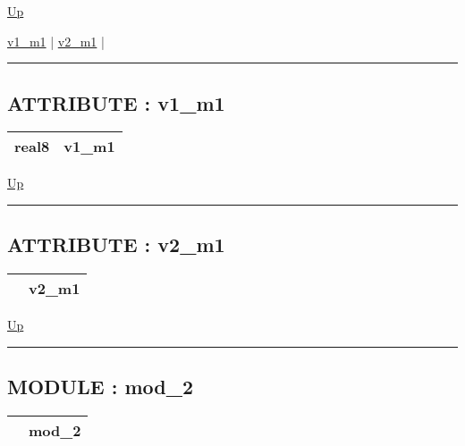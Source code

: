 \hyperlink{ecldoc:intest.in1intest.example_2}{Up}

\par


\hyperlink{ecldoc:intest.in1intest.example_2.mod_1.v1_m1}{v1\_m1}  |
\hyperlink{ecldoc:intest.in1intest.example_2.mod_1.v2_m1}{v2\_m1}  |

\rule{\textwidth}{0.4pt}

\subsection*{ATTRIBUTE : v1\_m1}
\hypertarget{ecldoc:intest.in1intest.example_2.mod_1.v1_m1}{}

{\renewcommand{\arraystretch}{1.5}
\begin{tabularx}{\textwidth}{|>{\raggedright\arraybackslash}l|X|}
\hline
\hspace{0pt}real8 & v1\_m1 \\
\hline
\end{tabularx}
}

\hyperlink{ecldoc:intest.in1intest.example_2.mod_1}{Up}

\par


\rule{\textwidth}{0.4pt}
\subsection*{ATTRIBUTE : v2\_m1}
\hypertarget{ecldoc:intest.in1intest.example_2.mod_1.v2_m1}{}

{\renewcommand{\arraystretch}{1.5}
\begin{tabularx}{\textwidth}{|>{\raggedright\arraybackslash}l|X|}
\hline
\hspace{0pt} & v2\_m1 \\
\hline
\end{tabularx}
}

\hyperlink{ecldoc:intest.in1intest.example_2.mod_1}{Up}

\par


\rule{\textwidth}{0.4pt}


\subsection*{MODULE : mod\_2}
\hypertarget{ecldoc:intest.in1intest.example_2.mod_2}{}

{\renewcommand{\arraystretch}{1.5}
\begin{tabularx}{\textwidth}{|>{\raggedright\arraybackslash}l|X|}
\hline
\hspace{0pt} & mod\_2 \\
\hline
\end{tabularx}
}

